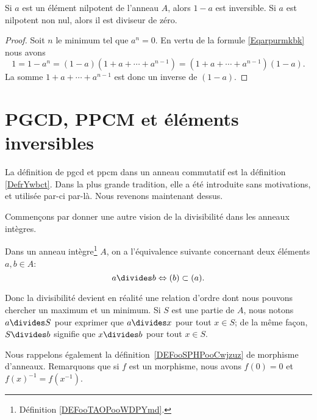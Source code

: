 \begin{proposition}
    Si \( a\) est un élément nilpotent de l'anneau \( A\), alors \( 1-a\) est inversible. Si \( a\) est nilpotent non nul, alors il est diviseur de zéro.
\end{proposition}

\begin{proof}
    Soit \( n\) le minimum tel que \( a^n=0\). En vertu de la formule \eqref{Eqarpurmkbk} nous avons
    \begin{equation}
        1=1-a^n=(1-a)(1+a+\cdots+a^{n-1})=(1+a+\cdots+a^{n-1})(1-a).
    \end{equation}
    La somme \( 1+a+\cdots+a^{n-1}\) est donc un inverse de \( (1-a)\).
\end{proof}

\section{PGCD, PPCM et éléments inversibles}

La définition de pgcd et ppcm dans un anneau commutatif est la définition \ref{DefrYwbct}. Dans la plus grande tradition, elle a été introduite sans motivations, et utilisée par-ci par-là. Nous revenons maintenant dessus.

Commençons par donner une autre vision de la divisibilité dans les anneaux intègres.
\begin{proposition}\label{PropDiviseurIdeaux}
    Dans un anneau intègre\footnote{Définition \ref{DEFooTAOPooWDPYmd}.} $A$, on a l'équivalence suivante concernant deux éléments \( a, b \in A \):
\begin{equation}
    a\divides b\Leftrightarrow (b)\subset (a).
\end{equation}
\end{proposition}

Donc la divisibilité devient en réalité une relation d'ordre dont nous pouvons chercher un maximum et un minimum. Si \( S\) est une partie de \( A\), nous notons \( a\divides S\) pour exprimer que \( a\divides x\) pour tout \( x\in S\); de la même façon, \( S\divides b\) signifie que \( x\divides b\) pour tout \( x\in S\).


Nous rappelons également la définition~\ref{DEFooSPHPooCwjzuz} de morphisme d'anneaux. Remarquons que si \( f\) est un morphisme, nous avons \( f(0)=0\) et \( f(x)^{-1}=f(x^{-1})\).


